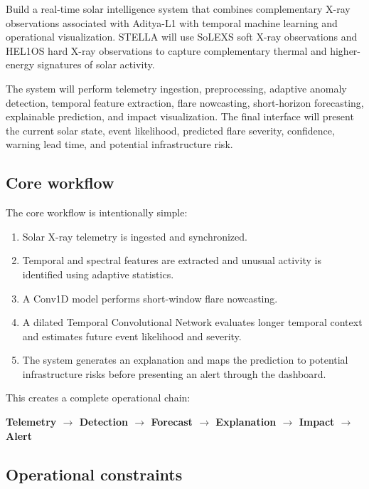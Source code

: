 \documentclass[10pt,a4paper]{article}
\begin{document}
Build a real-time solar intelligence system that combines complementary X-ray
observations associated with Aditya-L1 with temporal machine learning and operational
visualization. STELLA will use SoLEXS soft X-ray observations and HEL1OS hard X-ray
observations to capture complementary thermal and higher-energy signatures of solar
activity.

The system will perform telemetry ingestion, preprocessing, adaptive anomaly
detection, temporal feature extraction, flare nowcasting, short-horizon forecasting,
explainable prediction, and impact visualization. The final interface will present
the current solar state, event likelihood, predicted flare severity, confidence,
warning lead time, and potential infrastructure risk.

\subsection{Core workflow}

The core workflow is intentionally simple:

\begin{enumerate}
    \item Solar X-ray telemetry is ingested and synchronized.
    \item Temporal and spectral features are extracted and unusual activity is
    identified using adaptive statistics.
    \item A Conv1D model performs short-window flare nowcasting.
    \item A dilated Temporal Convolutional Network evaluates longer temporal context
    and estimates future event likelihood and severity.
    \item The system generates an explanation and maps the prediction to potential
    infrastructure risks before presenting an alert through the dashboard.
\end{enumerate}

This creates a complete operational chain:

\begin{center}
\textbf{Telemetry $\rightarrow$ Detection $\rightarrow$ Forecast $\rightarrow$
Explanation $\rightarrow$ Impact $\rightarrow$ Alert}
\end{center}

\subsection{Operational constraints}
\end{document}
